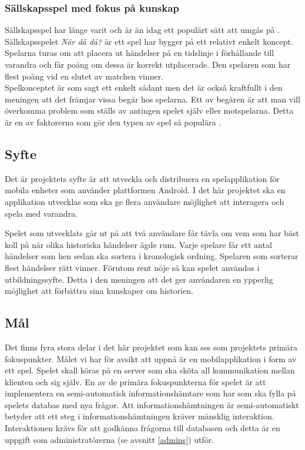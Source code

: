 \documentclass[a4paper, 11pt]{article}
\begin{document}
\subsubsection{Sällskapsspel med fokus på kunskap}
Sällskapsspel har länge varit och är än idag ett populärt sätt att umgås på \cite{bradspelspop}. Sällskapsspelet \textit{När då då?} \cite{nardada} är ett spel har bygger på ett relativt enkelt koncept. Spelarna turas om att placera ut händelser på en tidslinje i förhållande till varandra och får poäng om dessa är korrekt utplacerade. Den spelaren som har flest poäng vid en slutet av matchen vinner. \\
Spelkonceptet är som sagt ett enkelt sådant men det är också kraftfullt i den meningen att det främjar vissa begär hos spelarna. Ett av begären är att man vill överkomma problem som ställs av antingen spelet själv eller motspelarna. Detta är en av faktorerna som gör den typen av spel så populära \cite{psykologi}.

\subsection{Syfte}
Det är projektets syfte är att utveckla och distribuera en spelapplikation för mobila enheter som använder plattformen Android. I det här projektet ska en applikation utvecklas som ska ge flera användare möjlighet att interagera och spela med varandra.

Spelet som utvecklats går ut på att två användare får tävla om vem som har bäst koll på när olika historiska händelser ägde rum. Varje spelare får ett antal händelser som hen sedan ska sortera i kronologisk ordning. Spelaren som sorterar flest händelser rätt vinner. Förutom rent nöje så kan spelet användas i utbildningssyfte. Detta i den meningen att det ger användaren en ypperlig möjlighet att förbättra sina kunskaper om historien.

\subsection{Mål}
Det finns fyra stora delar i det här projektet som kan ses som projektets primära fokuspunkter. Målet vi har för avsikt att uppnå är en mobilapplikation i form av ett spel. Spelet skall köras på en server som ska sköta all kommunikation mellan klienten och sig själv. En av de primära fokuspunkterna för spelet är att implementera en semi-automatisk informationshämtare som har som ska fylla på spelets databas med nya frågor. Att informationshämtningen är semi-automatiskt betyder att ett steg i informationshämtningen kräver mänsklig interaktion. Interaktionen krävs för att godkänna frågorna till databasen och detta är en uppgift som administratörerna (se avsnitt \ref{admins}) utför. 
\end{document}
